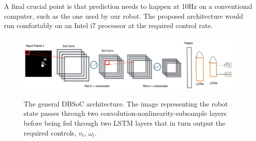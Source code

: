 \documentclass[letterpaper, 10 pt, conference]{ieeeconf}
\begin{document}
A final crucial point is that prediction needs to happen at 10Hz on a conventional computer, such as the one used by our robot. The proposed architecture would run comfortably on an Intel i7 processor at the required control rate.


  	\begin{figure}[tbh]
	\centering
    \includegraphics[scale = 0.22]{images/arch.png}
    \label{fig:data}
  \caption{The general DBSoC architecture. The image representing the robot state passes through two convolution-nonlinearity-subsample layers before being fed through two LSTM layers that in turn output the required controls, $v_t$, $\omega_t$. }

    \vspace{-2mm}
  \label{fig:data_robot}
  \end{figure}

\end{document}
